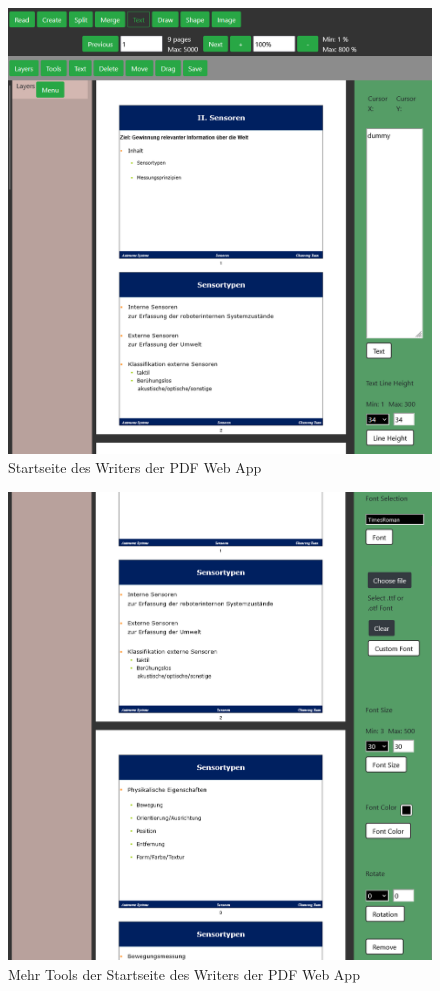 \begin{figure}[!htbp]
	\centering
	\includegraphics[width=1\textwidth]{"images/texteditor.png"}
	\caption{Startseite des Writers der PDF Web App}
	\label{fig:texteditor}
\end{figure}

\begin{figure}[!htbp]
	\centering
	\includegraphics[width=1\textwidth]{"images/texteditor2.png"}
	\caption{Mehr Tools der Startseite des Writers der PDF Web App}
	\label{fig:texteditor2}
\end{figure}

